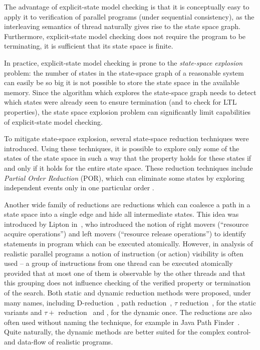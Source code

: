 The advantage of explicit-state model checking is that it is conceptually easy
to apply it to verification of parallel programs (under sequential
consistency), as the interleaving semantics of thread naturally gives rise to
the state space graph.
Furthermore, explicit-state model checking does not require the program to be terminating, it is sufficient that its state space is finite.

In practice, explicit-state model checking is prone to the \emph{state-space
explosion} problem: the number of states in the state-space graph of a
reasonable system can easily be so big it is not possible to store the state
space in the available memory.
Since the algorithm which explores the state-space graph needs to detect which
states were already seen to ensure termination (and to check for LTL
properties), the state space explosion problem can significantly limit
capabilities of explicit-state model checking.

To mitigate state-space explosion, several state-space reduction techniques
were introduced.
Using these techniques, it is possible to explore only some of the states of
the state space in such a way that the property holds for these states if and
only if it holds for the entire state space.
These reduction techniques include \emph{Partial Order Reduction} (POR), which
can eliminate some states by exploring independent events only in one
particular order \cite{Peled1993,Godefroid1996partial,TODO}.

Another wide family of reductions are reductions which can coalesce a path in a
state space into a single edge and hide all intermediate states.
This idea was introduced by Lipton in~\cite{Lipton1975}, who introduced the
notion of right movers (``resource acquire operations'') and left movers
(``resource release operations'') to identify statements in program which can
be executed atomically.
However, in analysis of realistic parallel programs a notion of instruction (or
action) visibility is often used -- a group of instructions from one thread can
be executed atomically provided that at most one of them is observable by the
other threads and that this grouping does not influence checking of the
verified property or termination of the search.
Both static and dynamic reduction methods were proposed, under many names,
including D-reduction~\cite{Lipton1975}, path reduction~\cite{Yorav2004}, $\tau$ reduction~\cite{BBR2012},  for the static variants and $\tau+$ reduction~\cite{RBB13} and \cite[Section 6]{RSCB2018},  for the dynamic once.
The reductions are also often used without naming the technique, for example in
Java Path Finder~\cite{Visser2003}.
Quite naturally, the dynamic methods are better suited for the complex control-
and data-flow of realistic programs.

